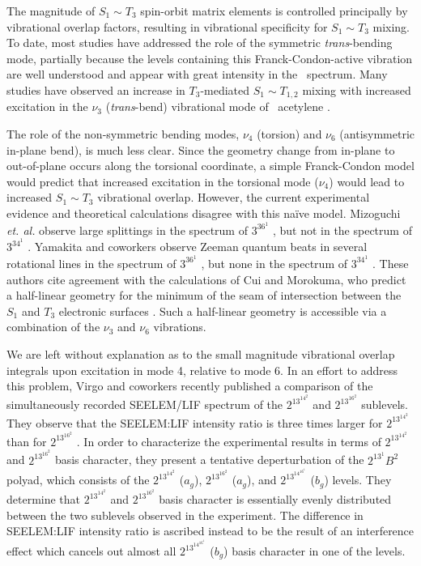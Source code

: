 
The magnitude of $S_1 \sim T_3$ spin-orbit matrix elements is
controlled principally by vibrational overlap factors, resulting in
vibrational specificity for $S_1 \sim T_3$ mixing.  To date, most
studies have addressed the role of the symmetric \emph{trans}-bending
mode, partially because the levels containing this
Franck-Condon-active vibration are well understood and appear with
great intensity in the \AtoX\ spectrum.  Many studies have observed an
increase in $T_3$-mediated $S_1 \sim T_{1,2}$ mixing with increased
excitation in the $\nu_3$ (\emph{trans}-bend) vibrational mode of
\astate\ acetylene \cite{dupre91, ochi91, humphrey97}.

The role of the non-symmetric bending modes, $\nu_4$ (torsion) and
$\nu_6$ (antisymmetric in-plane bend), is much less clear.  Since the
geometry change from in-plane to out-of-plane occurs along the
torsional coordinate, a simple Franck-Condon model would predict that
increased excitation in the torsional mode ($\nu_4$) would lead to
increased $S_1 \sim T_3$ vibrational overlap.  However, the current
experimental evidence and theoretical calculations disagree with this
na\"{i}ve model.  Mizoguchi \emph{et. al.} observe large splittings in
the spectrum of $3^36^1$ , but not in the spectrum of $3^34^1$
 \cite{mizoguchi00}.  Yamakita and coworkers observe Zeeman
quantum beats in several rotational lines in the spectrum of $3^36^1$
, but none in the spectrum of $3^34^1$  \cite{yamakita01}.
These authors cite agreement with the calculations of Cui and
Morokuma, who predict a half-linear geometry for the minimum of the
seam of intersection between the $S_1$ and $T_3$ electronic surfaces
\cite{cui96}.  Such a half-linear geometry is accessible via a
combination of the $\nu_3$ and $\nu_6$ vibrations.

We are left without explanation as to the small magnitude vibrational
overlap integrals upon excitation in mode 4, relative to mode 6.  In
an effort to address this problem, Virgo and coworkers recently
published a comparison of the simultaneously recorded SEELEM/LIF
spectrum of the $2^13^14^2$  and $2^13^16^2$  sublevels.
They observe that the SEELEM:LIF intensity ratio is three times larger
for $2^13^14^2$  than for $2^13^16^2$ .  In order to
characterize the experimental results in terms of $2^13^14^2$ and
$2^13^16^2$ basis character, they present a tentative deperturbation
of the $2^13^1B^2$ polyad, which consists of the $2^13^14^2$ ($a_g$),
$2^13^16^2$ ($a_g$), and $2^13^14^16^1$ ($b_g$) levels.  They
determine that $2^13^14^2$ and $2^13^16^2$ basis character is
essentially evenly distributed between the two  sublevels
observed in the experiment.  The difference in SEELEM:LIF intensity
ratio is ascribed instead to be the result of an interference effect
which cancels out almost all $2^13^14^16^1$ ($b_g$) basis character in
one of the levels.

